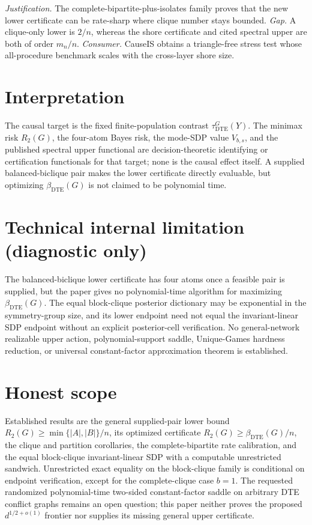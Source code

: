 \documentclass{article}
\begin{document}
\par\smallskip\noindent \textit{Justification.} The complete-bipartite-plus-isolates family proves that the new lower certificate can be rate-sharp where clique number stays bounded. \textit{Gap.} A clique-only lower is \(2/n\), whereas the shore certificate and cited spectral upper are both of order \(m_n/n\). \textit{Consumer.} CauseIS obtains a triangle-free stress test whose all-procedure benchmark scales with the cross-layer shore size.

\section{Interpretation}

The causal target is the fixed finite-population contrast \(\tau_{\mathrm{DTE}}^G(Y)\). The minimax risk \(R_2(G)\), the four-atom Bayes risk, the mode-SDP value \(V_{b,s}\), and the published spectral upper functional are decision-theoretic identifying or certification functionals for that target; none is the causal effect itself. A supplied balanced-biclique pair makes the lower certificate directly evaluable, but optimizing \(\beta_{\mathrm{DTE}}(G)\) is not claimed to be polynomial time.

\section*{Technical internal limitation (diagnostic only)}

The balanced-biclique lower certificate has four atoms once a feasible pair is supplied, but the paper gives no polynomial-time algorithm for maximizing \(\beta_{\mathrm{DTE}}(G)\). The equal block-clique posterior dictionary may be exponential in the symmetry-group size, and its lower endpoint need not equal the invariant-linear SDP endpoint without an explicit posterior-cell verification. No general-network realizable upper action, polynomial-support saddle, Unique-Games hardness reduction, or universal constant-factor approximation theorem is established.

\section{Honest scope}

Established results are the general supplied-pair lower bound \(R_2(G)\geq\min\{|A|,|B|\}/n\), its optimized certificate \(R_2(G)\geq\beta_{\mathrm{DTE}}(G)/n\), the clique and partition corollaries, the complete-bipartite rate calibration, and the equal block-clique invariant-linear SDP with a computable unrestricted sandwich. Unrestricted exact equality on the block-clique family is conditional on endpoint verification, except for the complete-clique case \(b=1\). The requested randomized polynomial-time two-sided constant-factor saddle on arbitrary DTE conflict graphs remains an open question; this paper neither proves the proposed \(d^{1/2+o(1)}\) frontier nor supplies its missing general upper certificate.
\end{document}
